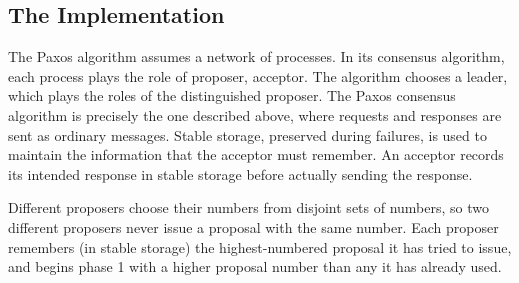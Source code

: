 \subsection{The Implementation}
The Paxos algorithm \cite{Lamport98} assumes a network of processes.
In its consensus algorithm, each process plays the role of proposer, acceptor.
The algorithm chooses a leader, which plays the roles of the distinguished proposer.
The Paxos consensus algorithm is precisely the one described above, where requests and responses are sent as ordinary messages.
Stable storage, preserved during failures, is used to maintain the information that the acceptor must remember.
An acceptor records its intended response in stable storage before actually sending the response.

Different proposers choose their numbers from disjoint sets of numbers, so two different proposers never issue a proposal with the same number.
Each proposer remembers (in stable storage) the highest-numbered proposal it has tried to issue, and begins phase 1 with a higher proposal number than any it has already used.
